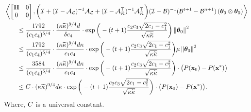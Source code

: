 	\begin{align}
		&\iprod{\begin{bmatrix}
			\Cov & \zero \\ \zero & \zero
			\end{bmatrix}}{\bigg( \eyeT + (\eyeT-\AL)^{-1}\AL + (\eyeT-\AR\T)^{-1}\AR\T\bigg) (\eyeT-\BT)^{-1}(\BT^{t+1}-\BT^{n+1}) \left(\thetat[0]\otimes \thetat[0]\right)} \nonumber\\ 
&\qquad\leq\frac{1792}{(\cone\cfour)^{5/4}}\cdot\frac{(\cnH\cnS)^{9/4}d}{\delta\cfour}\cdot\exp\bigg(-(t+1)\frac{\ctwo\cthree\sqrt{2\cone-\cone^2}}{\sqrt{\cnH\cnS}}\bigg)\norm{\thetat[0]}^2\nonumber\\
&\qquad\leq\frac{1792}{(\cone\cfour)^{5/4}}\cdot\frac{(\cnH\cnS)^{9/4}d\cnH}{\cone\cfour}\cdot\exp\bigg(-(t+1)\frac{\ctwo\cthree\sqrt{2\cone-\cone^2}}{\sqrt{\cnH\cnS}}\bigg)\mu\norm{\thetat[0]}^2\nonumber\\
&\qquad\leq\frac{3584}{(\cone\cfour)^{5/4}}\cdot\frac{(\cnH\cnS)^{9/4}d\cnH}{\cone\cfour}\cdot\exp\bigg(-(t+1)\frac{\ctwo\cthree\sqrt{2\cone-\cone^2}}{\sqrt{\cnH\cnS}}\bigg)\cdot\big(P(\x_0)-P(\xs)\big)\nonumber\\
&\qquad\leq\UC\cdot(\cnH\cnS)^{9/4}d\cnH\cdot\exp\bigg(-(t+1)\frac{\ctwo\cthree\sqrt{2\cone-\cone^2}}{\sqrt{\cnH\cnS}}\bigg)\cdot\big(P(\x_0)-P(\xs)\big).\label{eqn:bias-1}
	\end{align}
	Where, $\UC$ is a universal constant.
	
